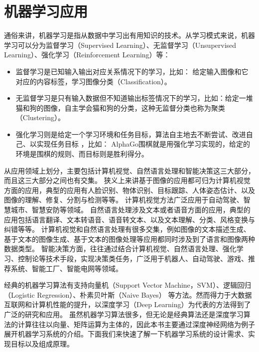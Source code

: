 \documentclass[letterpaper,10pt,english]{sphinxmanual}
\begin{document}
\section{机器学习应用}
\label{\detokenize{chapter_introduction/machine_learning_applications:id1}}\label{\detokenize{chapter_introduction/machine_learning_applications::doc}}
\sphinxAtStartPar
通俗来讲，机器学习是指从数据中学习出有用知识的技术。从学习模式来说，机器学习可以分为监督学习（Supervised
Learning）、无监督学习（Unsupervised Learning）、强化学习（Reinforcement
Learning）等：
\begin{itemize}
\item {} 
\sphinxAtStartPar
监督学习是已知输入输出对应关系情况下的学习，比如：
给定输入图像和它对应的内容标签，学习图像分类（Classification）。

\item {} 
\sphinxAtStartPar
无监督学习是只有输入数据但不知道输出标签情况下的学习，比如：给定一堆猫和狗的图像，自主学会猫和狗的分类，这种无监督分类也称为聚类（Clustering）。

\item {} 
\sphinxAtStartPar
强化学习则是给定一个学习环境和任务目标，算法自主地去不断尝试、改进自己、以实现任务目标
，比如：
AlphaGo围棋就是用强化学习实现的，给定的环境是围棋的规则、而目标则是胜利得分。

\end{itemize}

\sphinxAtStartPar
从应用领域上划分，主要包括计算机视觉、自然语言处理和智能决策这三大部分，而且这三大部分之间也有交集。
狭义上来讲基于图像的应用都可归为计算机视觉方面的应用，典型的应用有人脸识别、物体识别、目标跟踪、人体姿态估计、以及图像的理解、修复、分割与检测等等。
计算机视觉方法广泛应用于自动驾驶、智慧城市、智慧安防等领域。
自然语言处理涉及文本或者语音方面的应用，典型的应用包括语言翻译、文本转语音、语音转文本、以及文本理解、分类、风格变换与纠错等等。
计算机视觉和自然语言处理有很多交集，例如图像的文本描述生成、基于文本的图像生成、基于文本的图像处理等应用都同时涉及到了语言和图像两种数据类型。
智能决策方面，往往通过结合计算机视觉、自然语言处理、强化学习、控制论等技术手段，实现决策类任务，广泛用于机器人、自动驾驶、游戏、推荐系统、智能工厂、智能电网等领域。

\sphinxAtStartPar
经典的机器学习算法有支持向量机（Support Vector
Machine，SVM）、逻辑回归（Logistic Regression）、朴素贝叶斯（Naive
Bayes）
等方法。然而得力于大数据互联网和计算机性能的提升，以深度学习（Deep
Learning）为代表的方法得到了广泛的研究和应用。
虽然机器学习算法很多，但无论是经典算法还是深度学习算法的计算往往以向量、矩阵运算为主体的，因此本书主要通过深度神经网络为例子展开机器学习系统的介绍。下面我们来快速了解一下机器学习系统的设计需求、实现目标以及组成原理。
\end{document}
